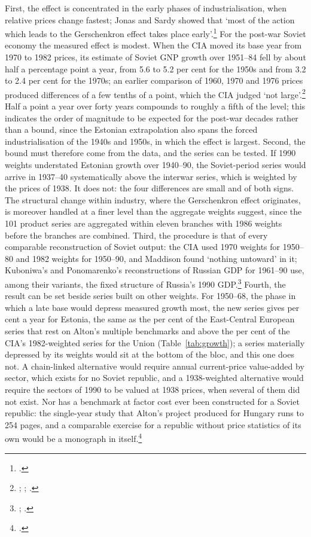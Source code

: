 First, the effect is concentrated in the early phases of industrialisation, when relative prices change fastest; Jonas and Sardy showed that `most of the action which leads to the Gerschenkron effect takes place early'.\footnote{\autocite[85]{jonassardy1970}.} For the post-war Soviet economy the measured effect is modest. When the CIA moved its base year from 1970 to 1982 prices, its estimate of Soviet GNP growth over 1951--84 fell by about half a percentage point a year, from 5.6 to 5.2 per cent for the 1950s and from 3.2 to 2.4 per cent for the 1970s; an earlier comparison of 1960, 1970 and 1976 prices produced differences of a few tenths of a point, which the CIA judged `not large'.\footnote{\autocite[8]{cia1990}; \autocite[23--4]{cia1982a}; \autocite[156]{harrison1993}.} Half a point a year over forty years compounds to roughly a fifth of the level; this indicates the order of magnitude to be expected for the post-war decades rather than a bound, since the Estonian extrapolation also spans the forced industrialisation of the 1940s and 1950s, in which the effect is largest. Second, the bound must therefore come from the data, and the series can be tested. If 1990 weights understated Estonian growth over 1940--90, the Soviet-period series would arrive in 1937--40 systematically above the interwar series, which is weighted by the prices of 1938. It does not: the four differences are small and of both signs. The structural change within industry, where the Gerschenkron effect originates, is moreover handled at a finer level than the aggregate weights suggest, since the 101 product series are aggregated within eleven branches with 1986 weights before the branches are combined. Third, the procedure is that of every comparable reconstruction of Soviet output: the CIA used 1970 weights for 1950--80 and 1982 weights for 1950--90, and Maddison found `nothing untoward' in it; Kuboniwa's and Ponomarenko's reconstructions of Russian GDP for 1961--90 use, among their variants, the fixed structure of Russia's 1990 GDP.\footnote{\autocite[312]{Maddison1998b}; \autocite[57, 62]{ponomarenko2002}.} Fourth, the result can be set beside series built on other weights. For 1950--68, the phase in which a late base would depress measured growth most, the new series gives  per cent a year for Estonia, the same as the  per cent of the East-Central European series that rest on Alton's multiple benchmarks and above the  per cent of the CIA's 1982-weighted series for the Union (Table~\ref{tab:growth}); a series materially depressed by its weights would sit at the bottom of the bloc, and this one does not. A chain-linked alternative would require annual current-price value-added by sector, which exists for no Soviet republic, and a 1938-weighted alternative would require the sectors of 1990 to be valued at 1938 prices, when several of them did not exist. Nor has a benchmark at factor cost ever been constructed for a Soviet republic: the single-year study that Alton's project produced for Hungary runs to 254 pages, and a comparable exercise for a republic without price statistics of its own would be a monograph in itself.\footnote{\autocite{alton_hungary}.}

